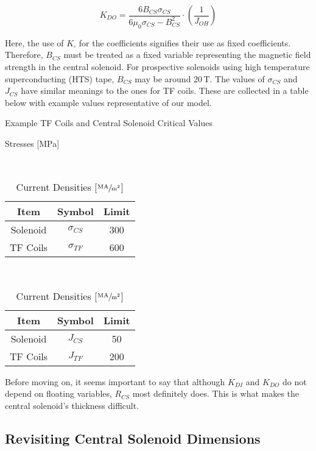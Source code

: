 \begin{equation}
	K_{DO} = \frac{6 B_{CS} \sigma_{CS}}{ 6 \mu_0 \sigma_{CS}  - B_{CS}^2 } \cdot \left( \frac{1}{J_{OH}} \right)
\end{equation}

Here, the use of $K_\square$ for the coefficients signifies their use as fixed coefficients. Therefore, $B_{CS}$ must be treated as a fixed variable representing the magnetic field strength in the central solenoid. For prospective solenoids using high temperature superconducting (HTS) tape, $B_{CS}$ may be around 20\,T. The values of $\sigma_{CS}$ and $J_{CS}$ have similar meanings to the ones for TF coils. These are collected in a table below with example values representative of our model.

\begin{table}[h!]
\centering	
\caption{Example TF Coils and Central Solenoid Critical Values}
\hfill
\begin{subtable}[t]{0.45\textwidth}
\centering	
\caption{Stresses [MPa]} ~\\
\begin{tabular}{ c|c|c } 

\textbf{Item} & \textbf{Symbol} & \textbf{Limit} \\
\hline
Solenoid & $\sigma_{CS}$ & 300 \\ 
TF Coils & $\sigma_{TF}$ & 600 \\ 
\end{tabular}
\end{subtable}
\hfill
\begin{subtable}[t]{0.45\textwidth}
\centering	
\caption{Current Densities [$\sfrac{\textnormal{MA}}{\textnormal{m}^2}$]} ~\\
\begin{tabular}{ c|c|c } 

\textbf{Item} & \textbf{Symbol} & \textbf{Limit} \\
\hline
Solenoid & $J_{CS}$ & 50 \\ 
TF Coils & $J_{TF}$ & 200 \\ 
\end{tabular}
\end{subtable}
\hfill
\hfill
\end{table}

Before moving on, it seems important to say that although $K_{DI}$ and $K_{DO}$ do not depend on floating variables, $R_{CS}$ most definitely does. This is what makes the central solenoid's thickness difficult.

\subsection{Revisiting Central Solenoid Dimensions}

